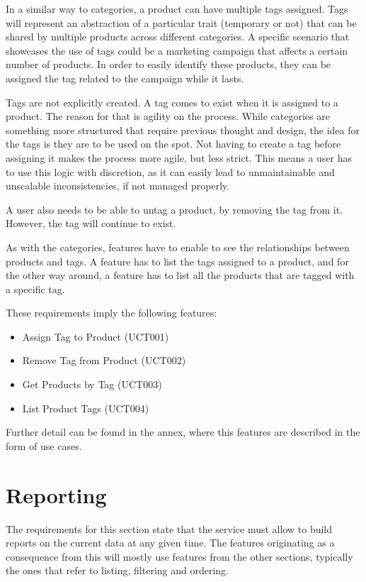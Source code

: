 In a similar way to categories, a product can have multiple tags assigned. Tags will represent an abstraction of a particular trait (temporary or not) that can be shared by multiple products across different categories. A specific scenario that showcases the use of tags could be a marketing campaign that affects a certain number of products. In order to easily identify these products, they can be assigned the tag related to the campaign while it lasts.

Tags are not explicitly created. A tag comes to exist when it is assigned to a product. The reason for that is agility on the process. While categories are something more structured that require previous thought and design, the idea for the tags is they are to be used on the spot. Not having to create a tag before assigning it makes the process more agile, but less strict. This means a user has to use this logic with discretion, as it can easily lead to unmaintainable and unscalable inconsistencies, if not managed properly.

A user also needs to be able to untag a product, by removing the tag from it. However, the tag will continue to exist.

As with the categories, features have to enable to see the relationships between products and tags. A feature has to list the tags assigned to a product, and for the other way around, a feature has to list all the products that are tagged with a specific tag.

These requirements imply the following features:

\begin{itemize}
\item Assign Tag to Product (UCT001)
\item Remove Tag from Product (UCT002)
\item Get Products by Tag (UCT003)
\item List Product Tags (UCT004)
\end{itemize}

Further detail can be found in the annex, where this features are described in the form of use cases.

\section{Reporting}
The requirements for this section state that the service must allow to build reports on the current data at any given time. The features originating as a consequence from this will mostly use features from the other sections, typically the ones that refer to listing, filtering and ordering.

